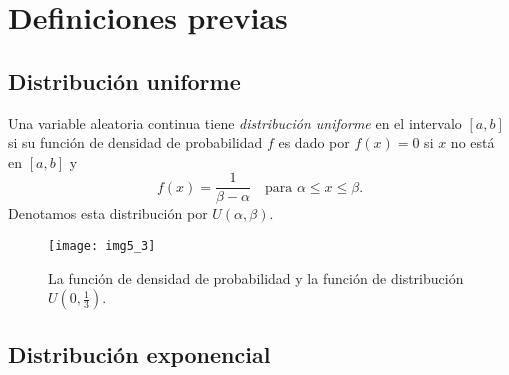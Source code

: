 \section{Definiciones previas}\label{sec:defi}

\subsection{Distribución uniforme}

	\begin{definition}
	Una variable aleatoria continua tiene \textit{distribución uniforme} en el intervalo $\left[a,b\right]$ si su función de densidad de probabilidad $f$ es dado por $f(x)=0$ si $x$ no está en $\left[a,b\right]$ y
	\[
		f(x)=\frac{1}{\beta-\alpha}\quad\text{para }\alpha \le x\le \beta.
	\]
	Denotamos esta distribución por $U\left(\alpha,\beta\right)$.
	\end{definition}

	\begin{figure}[!ht]
		\centering
		\texttt{[image: img5\_3]}
		\caption{La función de densidad de probabilidad y la función de distribución $U\left(0,\tfrac{1}{3}\right)$.}
	\end{figure}

\subsection{Distribución exponencial}

